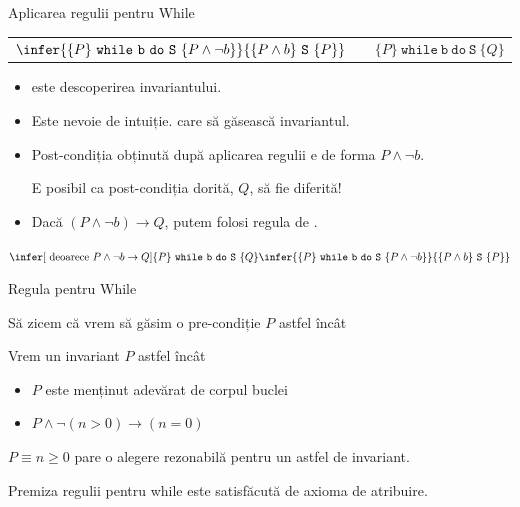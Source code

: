 \begin{frame}{Aplicarea regulii pentru While}

\begin{center}
\begin{tabular}{ccc}
$\infer{\{P\}\ \mathtt{while\ b\ do\ S}\ \{P\wedge \neg b\}}{\{P \wedge b\}\ \mathtt{S}\ \{P\}}$ &&  $\{P\}\ \mathtt{while\ b\ do\ S}\ \{Q\}$
\end{tabular}
\end{center}

\begin{itemize}
	\item {} este descoperirea \alert{invariantului}.

	\item Este nevoie de \alert{intuiție}.  care să găsească invariantul.

	\item Post-condiția obținută după aplicarea regulii e de forma $P\wedge \neg b$.

	 E posibil ca post-condiția dorită, $Q$, să fie diferită!

	\item Dacă $(P \wedge \neg b) \to Q$, putem folosi regula de .
\end{itemize}

\begin{center}
$
\infer[\mbox{ deoarece }P \wedge \neg b \to Q]{\{P\}\ \mathtt{while\ b\ do\ S}\ \{Q\}}
{
\infer{\{P\}\ \mathtt{while\ b\ do\ S}\ \{P\wedge \neg b\}}{\{P \wedge b\}\ \mathtt{S}\ \{P\}}
}
$
\end{center}
\end{frame}

\begin{frame}{Regula pentru While}

\begin{example}
Să zicem că vrem să găsim o pre-condiție $P$ astfel încât
\begin{center}
\end{center}
\pause
Vrem un invariant $P$ astfel încât
\begin{itemize}
	\item $P$ este menținut adevărat de corpul buclei
	\item $P \wedge \neg(n>0) \to (n=0)$
\end{itemize}
\pause
\alert{$P \equiv n\geq 0$} pare o alegere rezonabilă pentru un astfel de invariant.

Premiza regulii pentru while este satisfăcută de axioma de atribuire.


\end{example}
\end{frame}

